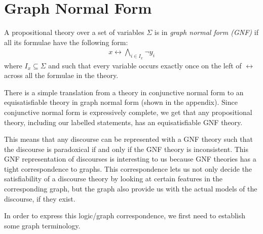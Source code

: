 \section{Graph Normal Form}
\label{sec:Graph Normal Form}
A propositional theory over a set of variables $\Sigma$ is in \textit{graph normal form (GNF)}\cite{apal-digraph} if all its formulae have the following form:
\begin{align}
  x \leftrightarrow \bigwedge_{i \in I_x} \neg y_i
\end{align}
where $I_x \subseteq \Sigma$ and such that every variable occurs exactly once on the left of $\leftrightarrow$ across all the formulae in the theory.

There is a simple translation from a theory in conjunctive normal form to an equisatisfiable theory in graph normal form (shown in the appendix).
Since conjunctive normal form is expressively complete, we get that any propositional theory, including our labelled statements, has an equisatisfiable GNF theory.

This means that any discourse can be represented with a GNF theory such that the discourse is paradoxical if and only if the GNF theory is inconsistent.
This GNF representation of discourses is interesting to us because GNF theories has a tight correspondence to graphs.
This correspondence lets us not only decide the satisfiability of a discourse theory by looking at certain features in the corresponding graph, but the graph also provide us with the actual models of the discourse, if they exist.

In order to express this logic/graph correspondence, we first need to establish some graph terminology.
